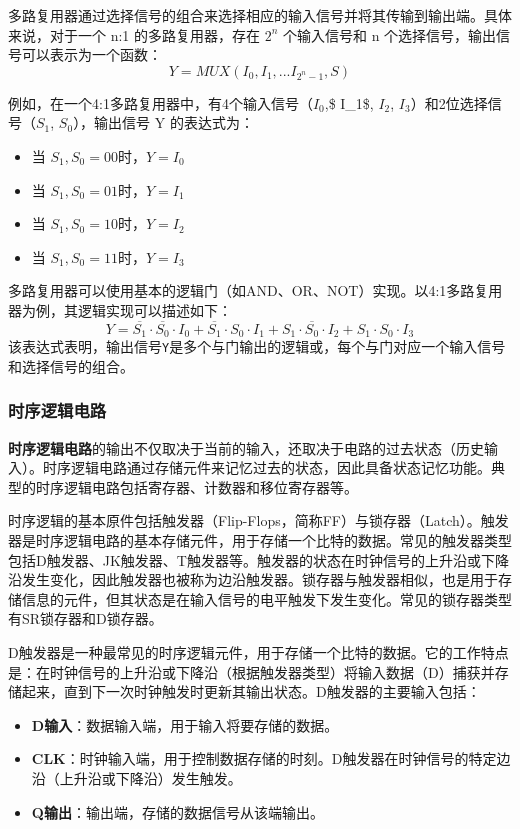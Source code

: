 多路复用器通过选择信号的组合来选择相应的输入信号并将其传输到输出端。具体来说，对于一个 n:1 的多路复用器，存在 \(2^n\)\hspace{0pt} 个输入信号和 n 个选择信号，输出信号可以表示为一个函数：
\[
Y = MUX(I_0,I_1,...I_{2^n-1},S)
\]

例如，在一个4:1多路复用器中，有4个输入信号（\(I_0\),\$ I\_1\$, \(I_2\), \(I_3\)）和2位选择信号（\(S_1\), \(S_0\)），输出信号 Y 的表达式为：

\begin{itemize}
\tightlist
\item
  当 \(S_1,S_0=00\)时，\(Y=I_0\)\hspace{0pt}
\item
  当 \(S_1,S_0=01\)时，\(Y=I_1\)
\item
  当 \(S_1,S_0=10\)时，\(Y=I_2\)
\item
  当 \(S_1,S_0=11\)时，\(Y=I_3\)
\end{itemize}

多路复用器可以使用基本的逻辑门（如AND、OR、NOT）实现。以4:1多路复用器为例，其逻辑实现可以描述如下：
\[
Y = \overline{S_1} \cdot \overline{S_0} \cdot I_0 + \overline{S_1} \cdot S_0 \cdot I_1 + S_1 \cdot \overline{S_0} \cdot I_2 + S_1 \cdot S_0 \cdot I_3
\]
该表达式表明，输出信号\texttt{Y}是多个与门输出的逻辑或，每个与门对应一个输入信号和选择信号的组合。

\subsubsection{时序逻辑电路}\label{sec:03-digital-logic-004}

\textbf{时序逻辑电路}的输出不仅取决于当前的输入，还取决于电路的过去状态（历史输入）。时序逻辑电路通过存储元件来记忆过去的状态，因此具备状态记忆功能。典型的时序逻辑电路包括寄存器、计数器和移位寄存器等。

时序逻辑的基本原件包括触发器（Flip-Flops，简称FF）与锁存器（Latch）。触发器是时序逻辑电路的基本存储元件，用于存储一个比特的数据。常见的触发器类型包括D触发器、JK触发器、T触发器等。触发器的状态在时钟信号的上升沿或下降沿发生变化，因此触发器也被称为边沿触发器。锁存器与触发器相似，也是用于存储信息的元件，但其状态是在输入信号的电平触发下发生变化。常见的锁存器类型有SR锁存器和D锁存器。

D触发器是一种最常见的时序逻辑元件，用于存储一个比特的数据。它的工作特点是：在时钟信号的上升沿或下降沿（根据触发器类型）将输入数据（D）捕获并存储起来，直到下一次时钟触发时更新其输出状态。D触发器的主要输入包括：

\begin{itemize}
\tightlist
\item
  \textbf{D输入}：数据输入端，用于输入将要存储的数据。
\item
  \textbf{CLK}：时钟输入端，用于控制数据存储的时刻。D触发器在时钟信号的特定边沿（上升沿或下降沿）发生触发。
\item
  \textbf{Q输出}：输出端，存储的数据信号从该端输出。
\end{itemize}

